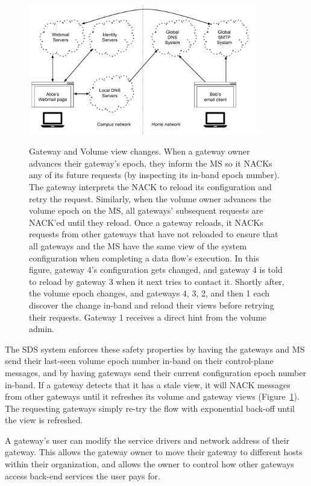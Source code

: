 \begin{figure}[h!]
   \caption{Gateway and Volume view changes.  When a gateway owner advances
   their gateway's epoch, they inform the MS so it NACKs any of its future
   requests (by inspecting its in-band epoch number).  The gateway interprets
   the NACK to reload its configuration and retry the request.  Similarly, when
   the volume owner advances the volume epoch on the MS, all gateways'
   subsequent requests are NACK'ed until they reload.  Once a gateway reloads,
   it NACKs requests from other gateways that have not reloaded to ensure that
   all gateways and the MS have the same view of the system configuration
   when completing a data flow's execution.  In this figure, gateway 4's
   configuration gets changed, and gateway 4 is told to reload by gateway 3 when it
   next tries to contact it.  Shortly after, the volume epoch changes, and
   gateways 4, 3, 2, and then 1 each discover the change in-band and reload
   their views before retrying their requests.  Gateway 1 receives a direct hint
   from the volume admin.}
   \centering
   \includegraphics[width=0.9\textwidth,page=12]{figures/dissertation-figures}
   \label{fig:chap2-view-changes}
\end{figure}

The SDS system enforces these safety properties by having the gateways and MS
send their last-seen volume epoch number in-band on their control-plane messages,
and by having gateways send their
current configuration epoch number in-band.  If a gateway detects that it has a stale
view, it will NACK messages from other gateways until it refreshes its volume
and gateway views (Figure~\ref{fig:chap2-view-changes}).
The requesting gateways simply re-try the flow with
exponential back-off until the view is refreshed.

A gateway's user can modify the service drivers and network address of their
gateway.  This allows the gateway owner to move their gateway to different hosts
within their organization, and allows the owner to control how other gateways
access back-end services the user pays for.

